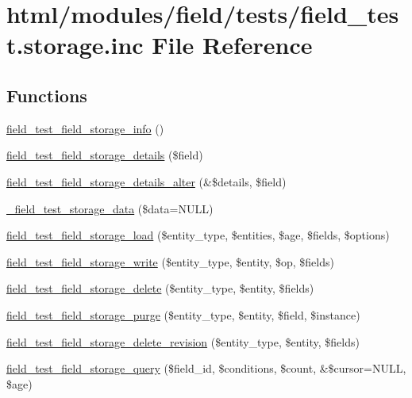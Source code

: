 \hypertarget{field__test_8storage_8inc}{
\section{html/modules/field/tests/field\_\-test.storage.inc File Reference}
\label{field__test_8storage_8inc}
}
\subsection*{Functions}
\begin{DoxyCompactItemize}
\item 
\hyperlink{field__test_8storage_8inc_a8467eb75b6a3cacbcd4a29fa23940e88}{field\_\-test\_\-field\_\-storage\_\-info} ()
\item 
\hyperlink{field__test_8storage_8inc_a13b21ea3b360341839b6082c2836e5eb}{field\_\-test\_\-field\_\-storage\_\-details} (\$field)
\item 
\hyperlink{field__test_8storage_8inc_a7aadff122767aac99f03d92e52d891cd}{field\_\-test\_\-field\_\-storage\_\-details\_\-alter} (\&\$details, \$field)
\item 
\hyperlink{field__test_8storage_8inc_aaf0cca5b16dd0669144dc5b3c8b1a2ba}{\_\-field\_\-test\_\-storage\_\-data} (\$data=NULL)
\item 
\hyperlink{field__test_8storage_8inc_a10f9c00a27624829625018699df8debf}{field\_\-test\_\-field\_\-storage\_\-load} (\$entity\_\-type, \$entities, \$age, \$fields, \$options)
\item 
\hyperlink{field__test_8storage_8inc_aa7f37b08fb61d3dc31226c409cb9a1ac}{field\_\-test\_\-field\_\-storage\_\-write} (\$entity\_\-type, \$entity, \$op, \$fields)
\item 
\hyperlink{field__test_8storage_8inc_a724f6b8c3ae75b4e9ace35cbe8981e83}{field\_\-test\_\-field\_\-storage\_\-delete} (\$entity\_\-type, \$entity, \$fields)
\item 
\hyperlink{field__test_8storage_8inc_a5faac556f945fdb5366f0a6034aa5360}{field\_\-test\_\-field\_\-storage\_\-purge} (\$entity\_\-type, \$entity, \$field, \$instance)
\item 
\hyperlink{field__test_8storage_8inc_a2bbfdc99551c6d326bb28324a88a0ffc}{field\_\-test\_\-field\_\-storage\_\-delete\_\-revision} (\$entity\_\-type, \$entity, \$fields)
\item 
\hyperlink{field__test_8storage_8inc_af02cd305f81f7d4059a81aab41d13b4c}{field\_\-test\_\-field\_\-storage\_\-query} (\$field\_\-id, \$conditions, \$count, \&\$cursor=NULL, \$age)

\end{DoxyCompactItemize}

